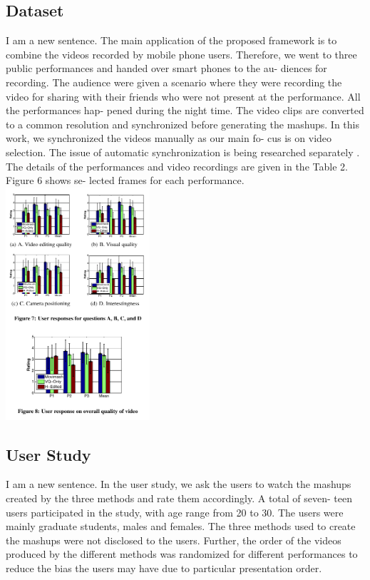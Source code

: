 \documentclass{sig-alternate}
\begin{document}
\subsection{Dataset}
I am a new sentence.
The main application of the proposed framework is to combine
the videos recorded by mobile phone users. Therefore, we went to
three public performances and handed over smart phones to the au-
diences for recording. The audience were given a scenario where
they were recording the video for sharing with their friends who
were not present at the performance. All the performances hap-
pened during the night time. The video clips are converted to a
common resolution and synchronized before generating the mashups.
In this work, we synchronized the videos manually as our main fo-
cus is on video selection. The issue of automatic synchronization is
being researched separately \cite{salas:fourteen}. The details of the performances
and video recordings are given in the Table 2. Figure 6 shows se-
lected frames for each performance.
\includegraphics[width=0.4\textwidth,left]{last.pdf}

\subsection{User Study}
I am a new sentence.
In the user study, we ask the users to watch the mashups created
by the three methods and rate them accordingly. A total of seven-
teen users participated in the study, with age range from 20 to 30.
The users were mainly graduate students, males and females. The
three methods used to create the mashups were not disclosed to the
users. Further, the order of the videos produced by the different
methods was randomized for different performances to reduce the
bias the users may have due to particular presentation order.
\end{document}
